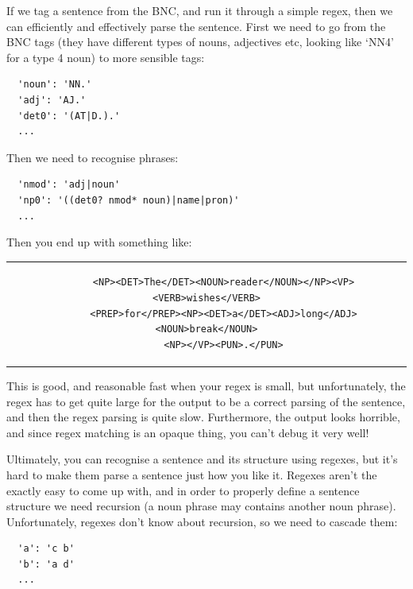 If we tag a sentence from the BNC, and run it through a simple regex, then we
can efficiently and effectively parse the sentence. First we need to go from the
BNC tags (they have different types of nouns, adjectives etc, looking like `NN4'
for a type 4 noun) to more sensible tags:

\begin{verbatim}
  'noun': 'NN.'
  'adj': 'AJ.'
  'det0': '(AT|D.).'
  ...
\end{verbatim}

Then we need to recognise phrases:

\begin{verbatim}
  'nmod': 'adj|noun'
  'np0': '((det0? nmod* noun)|name|pron)'
  ...
\end{verbatim}

Then you end up with something like:

\begin{center}
  \begin{tabular}{c}
    \begin{lstlisting}
      <NP><DET>The</DET><NOUN>reader</NOUN></NP><VP><VERB>wishes</VERB>
      <PREP>for</PREP><NP><DET>a</DET><ADJ>long</ADJ><NOUN>break</NOUN>
      <NP></VP><PUN>.</PUN>
    \end{lstlisting}
  \end{tabular}
\end{center}


This is good, and reasonable fast when your regex is small, but unfortunately,
the regex has to get quite large for the output to be a correct parsing of the
sentence, and then the regex parsing is quite slow. Furthermore, the output
looks horrible, and since regex matching is an opaque thing, you can't debug it
very well!

Ultimately, you can recognise a sentence and its structure using regexes, but
it's hard to make them parse a sentence just how you like it. Regexes aren't the
exactly easy to come up with, and in order to properly define a sentence
structure we need recursion (a noun phrase may contains another noun phrase).
Unfortunately, regexes don't know about recursion, so we need to cascade them:

\begin{verbatim}
  'a': 'c b'
  'b': 'a d'
  ...
\end{verbatim}

